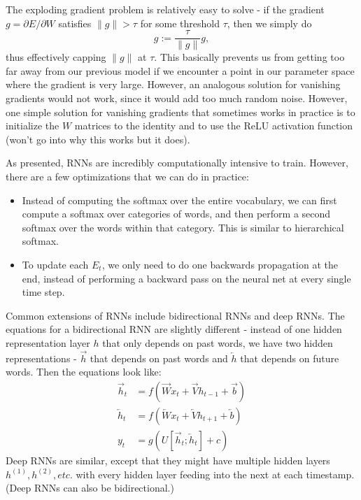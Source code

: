 The exploding gradient problem is relatively easy to solve - if the gradient $g = \partial E/\partial W$ satisfies $\| g \| > \tau$ for some threshold $\tau$, then we simply do
$$g := \frac{\tau}{\| g\|}g,$$
thus effectively capping $\|g\|$ at $\tau$. This basically prevents us from getting too far away from our previous model if we encounter a point in our parameter space where the gradient is very large. However, an analogous solution for vanishing gradients would not work, since it would add too much random noise. However, one simple solution for vanishing gradients that sometimes works in practice is to initialize the $W$ matrices to the identity and to use the ReLU activation function (won't go into why this works but it does).

As presented, RNNs are incredibly computationally intensive to train. However, there are a few optimizations that we can do in practice:
\begin{itemize}
\item Instead of computing the softmax over the entire vocabulary, we can first compute a softmax over categories of words, and then perform a second softmax over the words within that category. This is similar to hierarchical softmax.
\item To update each $E_t$, we only need to do one backwards propagation at the end, instead of performing a backward pass on the neural net at every single time step.
\end{itemize}

Common extensions of RNNs include bidirectional RNNs and deep RNNs. The equations for a bidirectional RNN are slightly different - instead of one hidden representation layer $h$ that only depends on past words, we have two hidden representations - $\overrightarrow{h}$ that depends on past words and $\overleftarrow{h}$ that depends on future words. Then the equations look like:
\begin{align*}
\overrightarrow{h}_t &= f(\overrightarrow{W}x_t + \overrightarrow{V}h_{t-1} + \overrightarrow{b}) \\
\overleftarrow{h}_t &= f(\overleftarrow{W}x_t + \overleftarrow{V}h_{t+1} + \overleftarrow{b}) \\
y_t &= g(U[\overrightarrow{h}_t; \overleftarrow{h}_t] + c)
\end{align*}
Deep RNNs are similar, except that they might have multiple hidden layers $h^{(1)}, h^{(2)}, etc.$ with every hidden layer feeding into the next at each timestamp. (Deep RNNs can also be bidirectional.)
